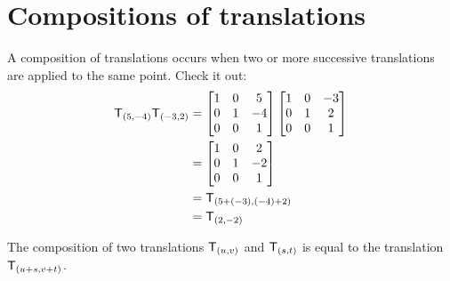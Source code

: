 \documentclass{ximera}
\begin{document}
\section{Compositions of translations}

A composition of translations occurs when two or more successive
translations are applied to the same point. Check it out:
\begin{align*}
\mathsf{T}_{(5,-4)}\mathsf{T}_{(-3,2)} &= \begin{bmatrix}
1 & 0 &  5\\
0 & 1 & -4\\
0 & 0 &  1
\end{bmatrix}
\begin{bmatrix}
1 & 0 & -3\\
0 & 1 &  2\\
0 & 0 &  1
\end{bmatrix}\\
&=\begin{bmatrix}
1 & 0 &  2\\
0 & 1 & -2\\
0 & 0 &  1
\end{bmatrix}\\
&=\mathsf{T}_{(5+(-3),(-4)+2)}\\
&=\mathsf{T}_{(2,-2)}
\end{align*}

\begin{theorem}
The composition of two translations $\mathsf{T}_{(u,v)}$ and
$\mathsf{T}_{(s,t)}$ is equal to the translation $\mathsf{T}_{(u+s,v+t)}$.
\end{theorem}
\end{document}
